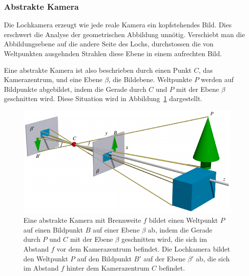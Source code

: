 \subsubsection{Abstrakte Kamera}
Die Lochkamera erzeugt wie jede reale Kamera ein kopfstehendes Bild.
Dies erschwert die Analyse der geometrischen Abbildung unnötig.
Verschiebt man die Abbildungsebene auf die andere Seite des Lochs,
durchstossen die von Weltpunkten ausgehnden Strahlen diese Ebene in
einem aufrechten Bild.

Eine abstrakte Kamera ist also beschrieben durch einen Punkt $C$,
das Kamerazentrum, und eine Ebene $\beta$, die Bildebene.
Weltpunkte $P$ werden auf Bildpunkte abgebildet, indem die Gerade
durch $C$ und $P$ mit der Ebene $\beta$ geschnitten wird.
Diese Situation wird in Abbildung~\ref{applications:kamera:abstrakt}
dargestellt.
\begin{figure}
\centering
\includegraphics{applications/kamera/abstrakt.pdf}
\caption{Eine abstrakte Kamera mit Brennweite $f$ bildet einen Weltpunkt
$P$ auf einen Bildpunkt $B$ auf einer Ebene $\beta$ ab,
indem die
Gerade durch $P$ und $C$ mit der Ebene $\beta$ geschnitten wird,
die sich im Abstand $f$ vor dem Kamerazentrum befindet.
Die Lochkamera bildet den Weltpunkt $P$ auf den Bildpunkt $B'$ auf der
Ebene $\beta'$ ab, die sich im Abstand $f$ hinter dem Kamerazentrum $C$
befindet.
\label{applications:kamera:abstrakt}}
\end{figure}

